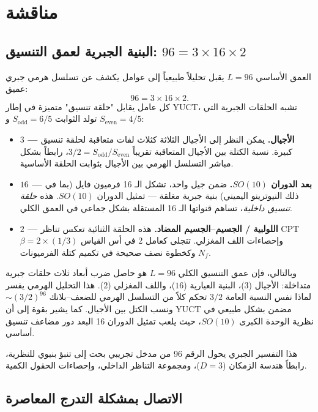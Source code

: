 \documentclass[11pt,a4paper]{article}
\newcommand{\Sodd}{S_{\mathrm{odd}}}
\newcommand{\Seven}{S_{\mathrm{even}}}
\begin{document}
	\section{مناقشة}
	\label{sec:discussion}
	
	\subsection{البنية الجبرية لعمق التنسيق: \(96 = 3 \times 16 \times 2\)}
	
	العمق الأساسي \(L = 96\) يقبل تحليلاً طبيعياً إلى عوامل يكشف عن تسلسل هرمي جبري عميق:
	\[
	96 = 3 \times 16 \times 2.
	\]
	كل عامل يقابل "حلقة تنسيق" متميزة في إطار YUCT، تشبه الحلقات الجبرية التي تولد الثوابت \(\Sodd = 6/5\) و \(\Seven = 4/5\):
	
	\begin{itemize}
		\item \textbf{\(3\) — الأجيال.} يمكن النظر إلى الأجيال الثلاثة كثلاث لفات متعاقبة لحلقة تنسيق كبيرة. نسبة الكتلة بين الأجيال المتعاقبة تقريباً \(3/2 = \Sodd/\Seven\)، رابطاً بشكل مباشر التسلسل الهرمي بين الأجيال بثوابت الحلقة الأساسية.
		\item \textbf{\(16\) — بعد الدوران \(SO(10)\).} ضمن جيل واحد، تشكل الـ 16 فرميون فايل (بما في ذلك النيوترينو اليميني) بنية جبرية مغلقة — تمثيل الدوران \(SO(10)\). هذه \emph{حلقة تنسيق داخلية}، تساهم قنواتها الـ 16 المستقلة بشكل جماعي في العمق الكلي.
		\item \textbf{\(2\) — اللولبية / الجسيم–الجسيم المضاد.} هذه الحلقة الثنائية تعكس تناظر CPT وإحصاءات اللف المغزلي. تتجلى كعامل 2 في أس القياس \(\beta = 2 \times (1/3)\) وكخطوة نصف صحيحة في تكميم كتلة الفرميونات \(N_f\).
	\end{itemize}
	
	وبالتالي، فإن عمق التنسيق الكلي \(L = 96\) هو حاصل ضرب أبعاد ثلاث حلقات جبرية متداخلة: الأجيال (\(3\))، البنية العيارية (\(16\))، واللف المغزلي (\(2\)). هذا التحليل الهرمي يفسر لماذا نفس النسبة العامة \(3/2\) تحكم كلاً من التسلسل الهرمي للضعف–بلانك \(\sim (3/2)^{96}\) ونسب الكتل بين الأجيال. كما يشير بقوة إلى أن YUCT مضمن بشكل طبيعي في نظرية الوحدة الكبرى \(SO(10)\)، حيث يلعب تمثيل الدوران 16 البعد دور مضاعف تنسيق أساسي.
	
	هذا التفسير الجبري يحول الرقم 96 من مدخل تجريبي بحت إلى تنبؤ بنيوي للنظرية، رابطاً هندسة الزمكان (\(D=3\))، ومجموعة التناظر الداخلي، وإحصاءات الحقول الكمية.
	
	\subsection{الاتصال بمشكلة التدرج المعاصرة}
	
\end{document}
